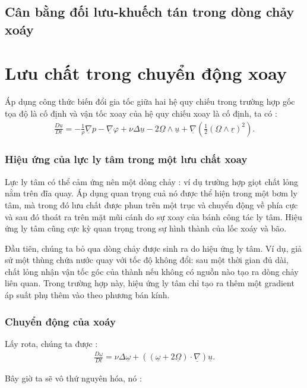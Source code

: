 \documentclass[THUY_DONG_HOC.tex]{subfiles}
\begin{document}
\subsection{Cân bằng đối lưu-khuếch tán trong dòng chảy xoáy}


\section{Lưu chất trong chuyển động xoay}
Áp dụng công thức biến đổi gia tốc giữa hai hệ quy chiếu trong trường hợp gốc tọa độ là cố định và vận tốc xoay của hệ quy chiếu xoay là cố định, ta có :
\begin{equation}
	\begin{aligned}
		\frac{D\underline{u}}{Dt}=-\frac{1}{\rho}\underline{\nabla}p-\underline{\nabla}\varphi+\nu\Delta\underline{u}-2\underline{\Omega}\wedge\underline{u}+\underline{\nabla}\left(\frac{1}{2}\left(\underline{\Omega}\wedge\underline{r}\right)^2\right).
	\end{aligned}
\end{equation}

\subsubsection{Hiệu ứng của lực ly tâm trong một lưu chất xoay}

Lực ly tâm có thể cảm ứng nên một dòng chảy : ví dụ trường hợp giọt chất lỏng nằm trên đĩa quay. Áp dụng quan trọng cuả nó được thể hiện trong một bơm ly tâm, mà trong đó lưu chất được phun trên một trục và chuyển động về phía cực và sau đó thoát ra trên mặt mũi cánh do sự xoay của bánh công tác ly tâm. Hiệu ứng ly tâm cũng cực kỳ quan trọng trong sự hình thành của lốc xoáy và bão.

Đầu tiên, chúng ta bỏ qua dòng chảy được sinh ra do hiệu ứng ly tâm. Ví dụ, giả sử một thùng chứa nước quay với tốc độ không đổi: sau một thời gian đủ dài, chất lỏng nhận vận tốc góc của thành nếu không có nguồn nào tạo ra dòng chảy liên quan. Trong trường hợp này, hiệu ứng ly tâm chỉ tạo ra thêm một gradient áp suất phụ thêm vào theo phương bán kính.

\subsubsection{Chuyển động của xoáy}
Lấy rota, chúng ta được :
\begin{equation}
	\begin{aligned}
		\frac{D\underline{\omega}}{Dt}=\nu\Delta\underline{\omega}+\left(\left(\underline{\omega}+2\underline{\Omega}\right)\cdot\underline{\nabla}\right)\underline{u}.
	\end{aligned}
\end{equation}

Bây giờ ta sẽ vô thứ nguyên hóa, nó :
\end{document}
